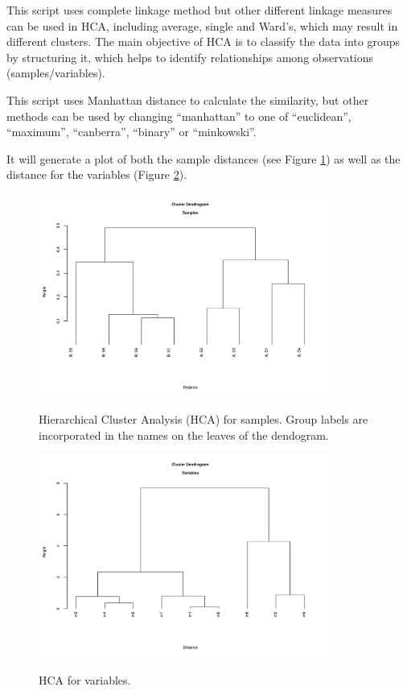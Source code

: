 \documentclass[english,a4paper,12pt]{article}
\begin{document}
This script uses complete linkage method but other different linkage measures can be used in HCA, including average, single and Ward's, which may result in different clusters.  The main objective of HCA is to classify the data into groups by structuring it, which helps to identify relationships among observations (samples/variables).

This script uses Manhattan distance to calculate the similarity, but other methods can be used by changing \textsf{``manhattan''} to one of \textsf{``euclidean''}, \textsf{``maximum''}, \textsf{``canberra''}, \textsf{``binary''} or \textsf{``minkowski''}.

It will generate a plot of both the sample distances (see Figure \ref{fig:HCA_smpl}) as well as the distance for the variables (Figure \ref{fig:HCA_var}).

\begin{figure}[!h!tb]
    \centering
    \includegraphics[width=0.85\textwidth]{images/HCA_smpl.png} \\
    \caption[HCA - Samples]{Hierarchical Cluster Analysis (HCA) for samples. Group labels are incorporated in the names on the leaves of the dendogram.}
    \label{fig:HCA_smpl}
\end{figure}

\begin{figure}[!ht!b]
    \centering
    \includegraphics[width=0.85\textwidth]{images/HCA_var.png} \\
    \caption[HCA - Variables]{HCA for variables.}
    \label{fig:HCA_var}
\end{figure}
\end{document}
